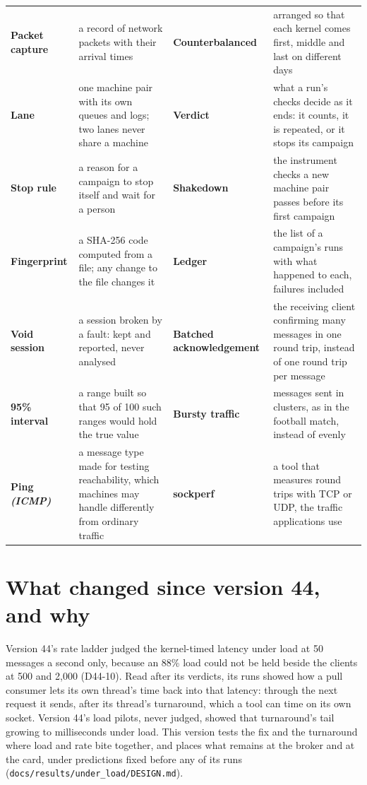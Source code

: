 \documentclass[11pt]{article}
\newcommand{\gl}[1]{{\color{soft}\itshape\small (#1)}}
\begin{document}
{\begin{tabularx}{\linewidth}{@{}>{\bfseries}p{3.1cm} X >{\bfseries}p{3.1cm} X@{}}
Packet capture & a record of network packets with their arrival times & Counterbalanced & arranged so that each kernel comes first, middle and last on different days \\
Lane & one machine pair with its own queues and logs; two lanes never share a machine & Verdict & what a run's checks decide as it ends: it counts, it is repeated, or it stops its campaign \\
Stop rule & a reason for a campaign to stop itself and wait for a person & Shakedown & the instrument checks a new machine pair passes before its first campaign \\
Fingerprint & a SHA-256 code computed from a file; any change to the file changes it & Ledger & the list of a campaign's runs with what happened to each, failures included \\
Void session & a session broken by a fault: kept and reported, never analysed & Batched acknowledgement & the receiving client confirming many messages in one round trip, instead of one round trip per message \\
95\% interval & a range built so that 95 of 100 such ranges would hold the true value & Bursty traffic & messages sent in clusters, as in the football match, instead of evenly \\
Ping \gl{ICMP} & a message type made for testing reachability, which machines may handle differently from ordinary traffic & sockperf & a tool that measures round trips with TCP or UDP, the traffic applications use \\
\end{tabularx}}

\section*{What changed since version 44, and why}
Version 44's rate ladder judged the kernel-timed latency under load at 50 messages a second only,
because an 88\% load could not be held beside the clients at 500 and 2,000 (D44-10). Read after
its verdicts, its runs showed how a pull consumer lets its own thread's time back into that
latency: through the next request it sends, after its thread's turnaround, which a tool can time
on its own socket. Version 44's load pilots, never judged, showed that turnaround's tail growing to
milliseconds under load. This version tests the fix and the turnaround where load and rate bite
together, and places what remains at the broker and at the card, under predictions fixed before
any of its runs (\texttt{docs/results/under\_load/DESIGN.md}).
\end{document}
